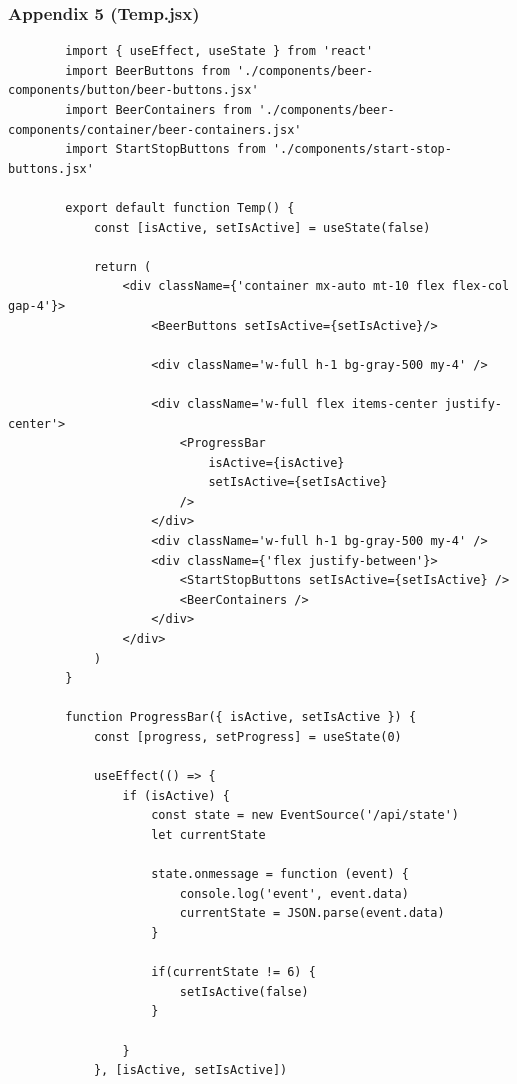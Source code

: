 \newpage
\subsubsection{Appendix 5 (Temp.jsx)}
\begin{center}
    \begin{verbatim}
        import { useEffect, useState } from 'react'
        import BeerButtons from './components/beer-components/button/beer-buttons.jsx'
        import BeerContainers from './components/beer-components/container/beer-containers.jsx'
        import StartStopButtons from './components/start-stop-buttons.jsx'

        export default function Temp() {
            const [isActive, setIsActive] = useState(false)

            return (
                <div className={'container mx-auto mt-10 flex flex-col gap-4'}>
                    <BeerButtons setIsActive={setIsActive}/>

                    <div className='w-full h-1 bg-gray-500 my-4' />

                    <div className='w-full flex items-center justify-center'>
                        <ProgressBar
                            isActive={isActive}
                            setIsActive={setIsActive}
                        />
                    </div>
                    <div className='w-full h-1 bg-gray-500 my-4' />
                    <div className={'flex justify-between'}>
                        <StartStopButtons setIsActive={setIsActive} />
                        <BeerContainers />
                    </div>
                </div>
            )
        }

        function ProgressBar({ isActive, setIsActive }) {
            const [progress, setProgress] = useState(0)

            useEffect(() => {
                if (isActive) {
                    const state = new EventSource('/api/state')
                    let currentState

                    state.onmessage = function (event) {
                        console.log('event', event.data)
                        currentState = JSON.parse(event.data)
                    }

                    if(currentState != 6) {
                        setIsActive(false)
                    }
                    
                }
            }, [isActive, setIsActive])


\end{verbatim}
\end{center}
